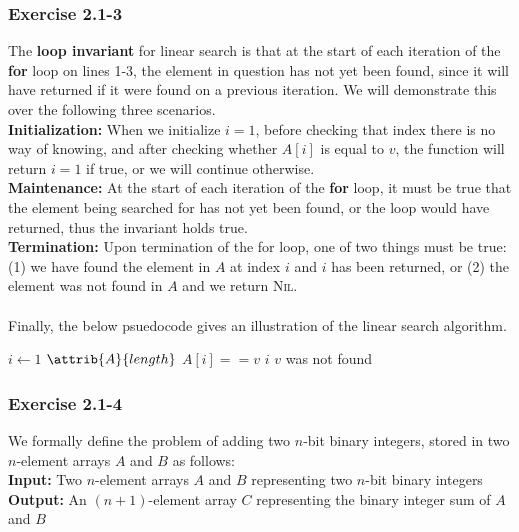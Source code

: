\documentclass{article}
\begin{document}
\subsubsection*{Exercise 2.1-3}

The \textbf{loop invariant} for linear search is that at the start of each iteration of the \textbf{for} loop on lines 1-3, the element in question has not yet been found, since it will have returned if it were found on a previous iteration. We will demonstrate this over the following three scenarios. \\
\textbf{Initialization:} When we initialize $i = 1$, before checking that index there is no way of knowing, and after checking whether $A[i]$ is equal to $v$, the function will return $i = 1$ if true, or we will continue otherwise. \\
\textbf{Maintenance:} At the start of each iteration of the \textbf{for} loop, it must be true that the element being searched for has not yet been found, or the loop would have returned, thus the invariant holds true. \\
\textbf{Termination:} Upon termination of the for loop, one of two things must be true: (1) we have found the element in $A$ at index $i$ and $i$ has been returned, or (2) the element was not found in $A$ and we return \textsc{Nil}. \\
\\
Finally, the below psuedocode gives an illustration of the linear search algorithm.

\begin{codebox}
\li \For $i \gets 1$ \To  $\attrib{A}{length}$
\li \Do
        \If $A[i] == v$
\li     \Do
            \Return $i$
        \End
    \End
\li \Comment $v$ was not found
\li \Return {} 
\end{codebox}

\subsubsection*{Exercise 2.1-4}

We formally define the problem of adding two $n$-bit binary integers, stored in two $n$-element arrays $A$ and $B$ as follows: \\
\textbf{Input:} Two $n$-element arrays $A$ and $B$ representing two $n$-bit binary integers \\
\textbf{Output:} An $(n+1)$-element array $C$ representing the binary integer sum of $A$ and $B$ \\
\end{document}
